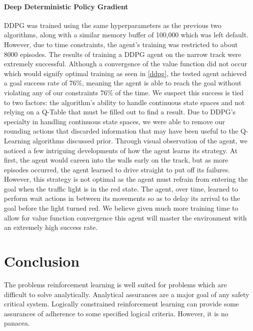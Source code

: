 \documentclass{article}
\begin{document}
\paragraph{Deep Deterministic Policy Gradient}
DDPG was trained using the same hyperparameters as the previous two algorithms, along with a similar memory buffer of 100,000 which was left default. However, due to time constraints, the agent's training was restricted to about 8000 episodes. The results of training a DDPG agent on the narrow track were extremely successful. Although a convergence of the value function did not occur which would signify optimal training as seen in \ref{ddpg}, the tested agent achieved a goal success rate of 76\%, meaning the agent is able to reach the goal without violating any of our constraints 76\% of the time. We suspect this success is tied to two factors: the algorithm's ability to handle continuous state spaces and not relying on a Q-Table that must be filled out to find a result. Due to DDPG's specialty in handling continuous state spaces, we were able to remove our rounding actions that discarded information that may have been useful to the Q-Learning algorithms discussed prior. Through visual observation of the agent, we noticed a few intriguing developments of how the agent learns its strategy. At first, the agent would careen into the walls early on the track, but as more episodes occurred, the agent learned to drive straight to put off its failures. However, this strategy is not optimal as the agent must refrain from entering the goal when the traffic light is in the red state. The agent, over time, learned to perform wait actions in between its movements so as to delay its arrival to the goal before the light turned red. We believe given much more training time to allow for value function convergence this agent will master the environment with an extremely high success rate.
\section{Conclusion}
The problems reinforcement learning is well suited for problems which are difficult to solve analytically. Analytical assurances are a major goal of any safety critical system. Logically constrained reinforcement learning can provide some assurances of adherence to some specified logical criteria. However, it is no panacea.
\end{document}
